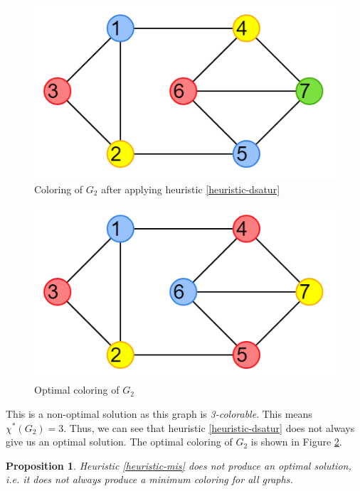 \documentclass{article}
\newcounter{heuristic} \setcounter{heuristic}{0}
\newtheorem{prop}{Proposition}
\theoremstyle{definition}
\begin{document}
\begin{multicols}{2}
  \begin{figure}[H]
  \centering
  \includegraphics[scale=0.5]{images/dsatur-2.png}
  \caption{Coloring of \(G_2\) after applying heuristic \ref{heuristic-dsatur}}\label{fig:ex2-colored}
  \end{figure}

  \begin{figure}[H]
  \centering
  \includegraphics[scale=0.5]{images/dsatur-3.png}
  \caption{Optimal coloring of \(G_2\)}\label{fig:ex2-optimal}
  \end{figure}
\end{multicols}

This is a non-optimal solution as this graph is \emph{3-colorable}. This means \(\chi^{*}(G_2) = 3\). Thus, we can see that heuristic \ref{heuristic-dsatur} does not always give us an optimal solution. The optimal coloring of $G_2$ is shown in Figure \ref{fig:ex2-optimal}.

\begin{prop}
Heuristic \ref{heuristic-mis} does not produce an optimal solution, i.e. it does not always produce a minimum coloring for all graphs.
\end{prop}
\end{document}

